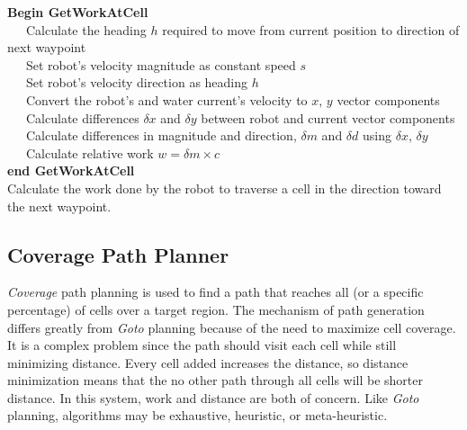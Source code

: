 \documentclass{tamuccthesis}
\begin{document}
\begin{algorithm}%
\textbf{Begin GetWorkAtCell}\\
~~~Calculate the heading $h$ required to move from current position to direction of next waypoint \\
~~~Set robot's velocity magnitude as constant speed $s$ \\
~~~Set robot's velocity direction as heading $h$ \\
~~~Convert the robot's and water current's velocity to $x$, $y$ vector components \\
~~~Calculate differences $\delta x$ and $\delta y$ between robot and current vector components \\
~~~Calculate differences in magnitude and direction, $\delta m$ and $\delta d$ using $\delta x$, $\delta y$ \\
~~~Calculate relative work $w = \delta m \times c$ \\
\textbf{end GetWorkAtCell} \\
\caption{Calculate the work done by the robot to traverse a cell in the direction toward the next waypoint.} 
\label{alg:getworkatcell}
\end{algorithm}



\subsection{Coverage Path Planner}

\textit{Coverage} path planning is used to find a path that reaches all (or a specific percentage) of cells over a target region. The mechanism of path generation differs greatly from \textit{Goto} planning because of the need to maximize cell coverage. It is a complex problem since the path should visit each cell while still minimizing distance. Every cell added increases the distance, so distance minimization means that the no other path through all cells will be shorter distance. In this system, work and distance are both of concern. Like \textit{Goto} planning, algorithms may be exhaustive, heuristic, or meta-heuristic. 
\end{document}
